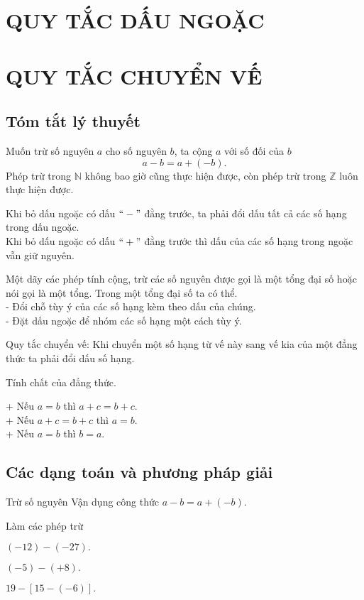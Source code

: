 \section{QUY TẮC DẤU NGOẶC}
\section{QUY TẮC CHUYỂN VẾ}
\subsection{Tóm tắt lý thuyết}
\begin{enumEX}{1}
		\item Muốn trừ số nguyên $a$ cho số nguyên $b$, ta cộng $a$ với số đối của $b$
	$$a-b = a+(-b).$$
	Phép trừ trong $\mathbb{N}$ không bao giờ cũng thực hiện được, còn phép trừ trong $\mathbb{Z}$ luôn thực hiện được.
	\item Khi bỏ dấu ngoặc có dấu $``-"$ đằng trước, ta phải đổi dấu tất cả các số hạng trong dấu ngoặc.\\
	Khi bỏ dấu ngoặc có dấu $``+"$ đằng trước thì dấu của các số hạng trong ngoặc vẫn giữ nguyên.
	\item Một dãy các phép tính cộng, trừ các số nguyên được gọi là một tổng đại số hoặc nói gọi là một tổng. Trong một tổng đại số ta có thể.\\
	- Đổi chỗ tùy ý của các số hạng kèm theo dấu của chúng.\\
	- Đặt dấu ngoặc để nhóm các số hạng một cách tùy ý.
	\item Quy tắc chuyển vế: Khi chuyển một số hạng từ vế này sang vế kia của một đẳng thức ta phải đổi dấu số hạng. 

	\item Tính chất của đẳng thức.

	+ Nếu $a =b$ thì $a+c = b+c$.\\
	 + Nếu $a+c = b+c$ thì $a =b$.\\
	 + Nếu $a = b$ thì $b =a.$
\end{enumEX}

\subsection{Các dạng toán và phương pháp giải}
\begin{dang}{Trừ số nguyên}
Vận dụng công thức $a -b = a+ (-b)$.
\end{dang}
\begin{vd}%
Làm các phép trừ
\begin{enumEX}{3}
	\item $(-12)-(-27).$
	\item $(-5)-(+8).$
	\item $19 -[15-(-6)].$
\end{enumEX}
\end{vd}

